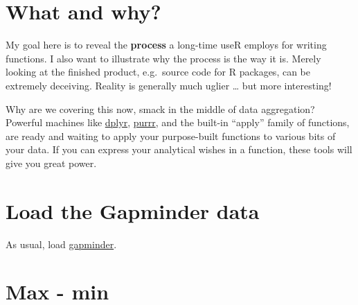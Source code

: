 \documentclass[
]{book}
\newenvironment{Shaded}{\begin{snugshade}}{\end{snugshade}}
\newcommand{\CommentTok}[1]{\textcolor[rgb]{0.56,0.35,0.01}{\textit{#1}}}
\newcommand{\KeywordTok}[1]{\textcolor[rgb]{0.13,0.29,0.53}{\textbf{#1}}}
\newcommand{\NormalTok}[1]{#1}
\begin{document}
\hypertarget{what-and-why}{%
\section{What and why?}\label{what-and-why}}

My goal here is to reveal the \textbf{process} a long-time useR employs for writing functions. I also want to illustrate why the process is the way it is. Merely looking at the finished product, e.g.~source code for R packages, can be extremely deceiving. Reality is generally much uglier \ldots{} but more interesting!

Why are we covering this now, smack in the middle of data aggregation? Powerful machines like \href{https://dplyr.tidyverse.org}{dplyr}, \href{https://purrr.tidyverse.org}{purrr}, and the built-in ``apply'' family of functions, are ready and waiting to apply your purpose-built functions to various bits of your data. If you can express your analytical wishes in a function, these tools will give you great power.

\hypertarget{load-the-gapminder-data}{%
\section{Load the Gapminder data}\label{load-the-gapminder-data}}

As usual, load \href{https://github.com/jennybc/gapminder}{gapminder}.

\begin{Shaded}
\end{Shaded}

\hypertarget{max---min}{%
\section{Max - min}\label{max---min}}
\end{document}
